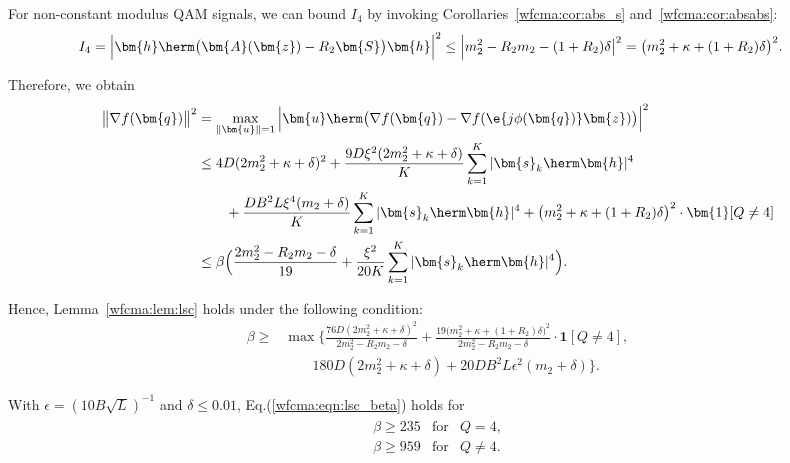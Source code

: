 For non-constant modulus QAM signals, we can bound $I_4$ by invoking Corollaries~\ref{wfcma:cor:abs_s} and~\ref{wfcma:cor:absabs}:
\begin{align}
	I_4&=\Big|\bm{h}\herm\big(\bm{A}(\bm{z})-R_2\bm{S}\big)\bm{h}\Big|^2
	\leq \Big|m_2^2-R_2m_2-(1+R_2)\delta\big|^2=\big(m_2^2+\kappa+(1+R_2)\delta\big)^2.\nonumber
\end{align}

Therefore, we obtain
\begin{align}
	\big\|\nabla f(\bm{q})\big\|^2 
	&=
	\max_{\|\bm{u}\|=1}\Big|\bm{u}\herm\big(\nabla f(\bm{q})-\nabla f(\e{j\phi(\bm{q})}\bm{z})\big)\Big|^2
	\nonumber\\&
	\leq 4D(2 m_2^2+\kappa+\delta)^2
	+\frac{9D\xi^2(2 m_2^2+\kappa+\delta)}{K}\sum_{k=1}^K|\bm{s}_k\herm\bm{h}|^4
	\nonumber\\&\qquad
	+\frac{DB^2L\xi^4(  m_2+\delta)}{K}\sum_{k=1}^K|\bm{s}_k\herm\bm{h}|^4
	+\big(m_2^2+\kappa+(1+R_2)\delta\big)^2\cdot\bm{1}[Q\neq 4]
	\nonumber\\
	&\leq\beta\Big(\frac{2  m_2^2-R_2m_2-\delta}{19}+\frac{\xi^2}{20K}\sum_{k=1}^K|\bm{s}_k\herm\bm{h}|^4\Big).\nonumber
\end{align}

Hence, Lemma~\ref{wfcma:lem:lsc} holds under the following condition:
\begin{align}
	\beta\geq&\max\Big\{\frac{76D(2m_2^2+\kappa+\delta)^2}{2m_2^2-R_2m_2-\delta}
	+\frac{19(m_2^2+\kappa+(1+R_2)\delta\big)^2}{2m_2^2-R_2m_2-\delta}\cdot\bm{1}[Q\neq4], \nonumber\\
	&\qquad 180D(2m_2^2+\kappa+\delta)+20DB^2L\epsilon^2(m_2+\delta)\Big\}.\label{wfcma:eqn:lsc_beta}
\end{align}

With $\epsilon=(10B\sqrt{L})^{-1}$ and $\delta\leq0.01$, Eq.(\ref{wfcma:eqn:lsc_beta}) holds for 
\begin{align}
	\begin{array}{lcc}
		\beta\geq 235&\text{for}&Q=4,\\
		\beta\geq 959&\text{for}&Q\neq4.\\
	\end{array}	\nonumber
\end{align} 











